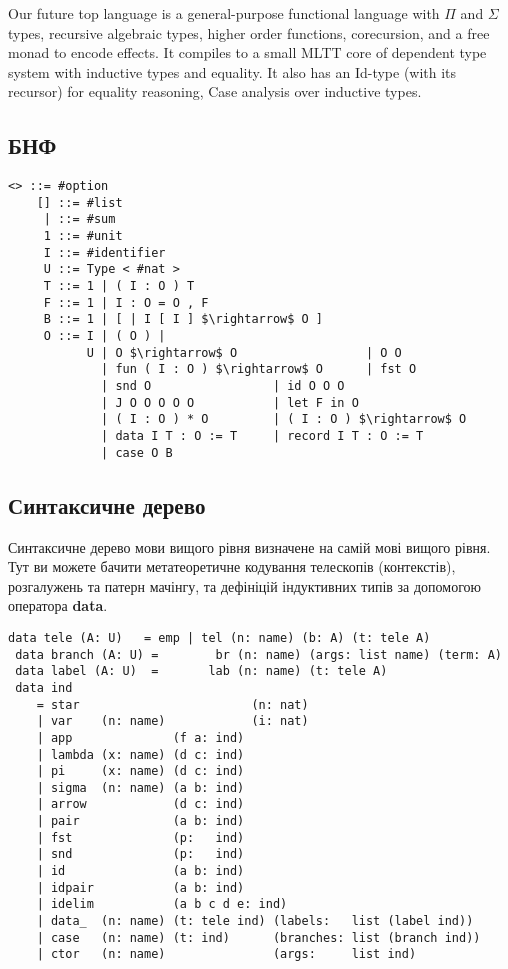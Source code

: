 \documentclass{article}
\begin{document}
Our future top language is a general-purpose functional language with $\Pi$ and $\Sigma$ types,
recursive algebraic types, higher order functions, corecursion, and a free monad to encode effects.
It compiles to a small MLTT core of dependent type system with inductive types and equality.
It also has an Id-type (with its recursor) for equality reasoning, Case analysis over inductive types.

\subsection{БНФ}

\begin{lstlisting}[mathescape=true]
    <> ::= #option
    [] ::= #list
     | ::= #sum
     1 ::= #unit
     I ::= #identifier
     U ::= Type < #nat >
     T ::= 1 | ( I : O ) T
     F ::= 1 | I : O = O , F
     B ::= 1 | [ | I [ I ] $\rightarrow$ O ]
     O ::= I | ( O ) |
           U | O $\rightarrow$ O                  | O O
             | fun ( I : O ) $\rightarrow$ O      | fst O
             | snd O                 | id O O O
             | J O O O O O           | let F in O
             | ( I : O ) * O         | ( I : O ) $\rightarrow$ O
             | data I T : O := T     | record I T : O := T
             | case O B
\end{lstlisting}

\subsection{Синтаксичне дерево}
Синтаксичне дерево мови вищого рівня визначене на самій мові вищого рівня.
Тут ви можете бачити метатеоретичне кодування телескопів (контекстів), розгалужень та патерн мачінгу,
та дефініцій індуктивних типів за допомогою оператора \textbf{data}.

\begin{lstlisting}[mathescape=true]
 data tele (A: U)   = emp | tel (n: name) (b: A) (t: tele A)
 data branch (A: U) =        br (n: name) (args: list name) (term: A)
 data label (A: U)  =       lab (n: name) (t: tele A)
 data ind
    = star                        (n: nat)
    | var    (n: name)            (i: nat)
    | app              (f a: ind)
    | lambda (x: name) (d c: ind)
    | pi     (x: name) (d c: ind)
    | sigma  (n: name) (a b: ind)
    | arrow            (d c: ind)
    | pair             (a b: ind)
    | fst              (p:   ind)
    | snd              (p:   ind)
    | id               (a b: ind)
    | idpair           (a b: ind)
    | idelim           (a b c d e: ind)
    | data_  (n: name) (t: tele ind) (labels:   list (label ind))
    | case   (n: name) (t: ind)      (branches: list (branch ind))
    | ctor   (n: name)               (args:     list ind)
\end{lstlisting}
\end{document}

